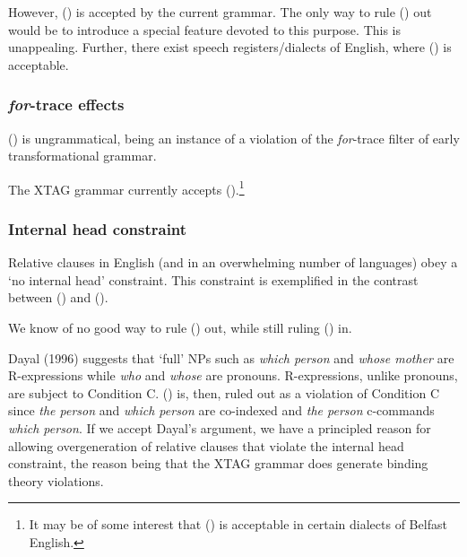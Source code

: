 
However, () is accepted by the current grammar.
The only way to rule () out would be to introduce a special feature
devoted to this purpose. This is unappealing. Further, there exist
speech registers/dialects of English, where () is acceptable. 

\subsubsection{{\em for}-trace effects}
() is ungrammatical, being an instance of a violation of the
{\em for}-trace filter of early transformational grammar.


The XTAG grammar currently accepts ().\footnote{It may be of
some interest that () is acceptable in certain dialects of Belfast
English.}


\subsubsection{Internal head constraint}
Relative clauses in English (and in an overwhelming number of languages)
obey a `no internal head' constraint. This constraint is exemplified in
the contrast between () and ().


We know of no good way to rule () out, while still ruling () in.

Dayal (1996) suggests that `full' NPs such as {\em which person} and
{\em whose mother} are R-expressions while {\em who} and {\em whose}
are pronouns. R-expressions, unlike pronouns, are subject to Condition C.
() is, then, ruled out as a violation of Condition C since {\em 
the person} and {\em which person} are co-indexed and {\em the person}
c-commands {\em which person}. If we accept Dayal's argument, we 
have a principled reason for allowing overgeneration of relative clauses
that violate the internal head constraint, the reason being that 
the XTAG grammar does generate binding theory violations.

